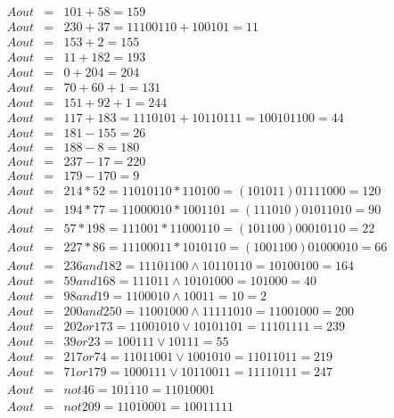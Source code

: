 \documentclass[12pt]{jreport}
\begin{document}
        \begin{eqnarray*}
            Aout &=& 101 + 58 = 159 \\
            Aout &=& 230 + 37 = 11100110 + 100101 = 11 \\
            Aout &=& 153 + 2 = 155 \\
            Aout &=& 11 + 182 = 193 \\
            Aout &=& 0 + 204 = 204 \\
            Aout &=& 70 + 60 + 1 = 131 \\
            Aout &=& 151 + 92 + 1 = 244 \\
            Aout &=& 117 + 183 = 1110101 + 10110111 = 100101100 = 44 \\
            Aout &=& 181 - 155 = 26 \\
            Aout &=& 188 - 8 = 180 \\
            Aout &=& 237 - 17 = 220 \\
            Aout &=& 179 - 170 = 9 \\
            Aout &=& 214 * 52 = 11010110 * 110100 = (101011)01111000 = 120 \\
            Aout &=& 194 * 77 = 11000010 * 1001101 = (111010)01011010 = 90 \\
            Aout &=& 57 * 198 = 111001 * 11000110 = (101100)00010110 = 22 \\
            Aout &=& 227 * 86 = 11100011 * 1010110 = (1001100)01000010 = 66 \\
            Aout &=& 236 and 182 = 11101100 \wedge 10110110 = 10100100 = 164 \\
            Aout &=& 59 and 168 = 111011 \wedge 10101000 = 101000 = 40 \\
            Aout &=& 98 and 19 = 1100010 \wedge 10011 = 10 = 2 \\
            Aout &=& 200 and 250 = 11001000 \wedge 11111010 = 11001000 = 200 \\
            Aout &=& 202 or 173 = 11001010 \vee 10101101 = 11101111 = 239 \\
            Aout &=& 39 or 23 = 100111 \vee 10111 = 55 \\
            Aout &=& 217 or 74 = 11011001 \vee 1001010 = 11011011 = 219 \\
            Aout &=& 71 or 179 = 1000111 \vee 10110011 = 11110111 = 247 \\
            Aout &=& not 46 = \overline{101110} = 11010001 \\
            Aout &=& not 209 = \overline{11010001} = 10011111 \\

\end{eqnarray*}
\end{document}
